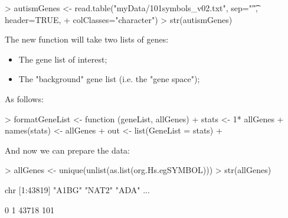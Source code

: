 \documentclass[11pt]{article}
\newcommand{\Rcode}[1]{{\texttt{\color{BrickRed}{#1}}}}
\renewenvironment{Schunk}{\vspace{\topsep}}{\vspace{\topsep}}
\begin{document}
\begin{Schunk}
\begin{Sinput}
> autismGenes <- read.table("myData/101symbols_v02.txt", sep="\t", header=TRUE,
+                           colClasses="character")
> str(autismGenes)
\end{Sinput}
\end{Schunk}

The new function \Rcode{formatGeneList} will take
two lists of genes:
\begin{itemize}
\item The gene list of interest;
\item The "background" gene list (i.e. the "gene space");
\end{itemize}

As follows:

\begin{Schunk}
\begin{Sinput}
> formatGeneList <- function (geneList, allGenes) {
+   stats <- 1* allGenes %
+   names(stats) <- allGenes
+   out <- list(GeneList = stats)
+ 	}
\end{Sinput}
\end{Schunk}

And now we can prepare the data:

\begin{Schunk}
\begin{Sinput}
> allGenes <- unique(unlist(as.list(org.Hs.egSYMBOL)))
> str(allGenes)
\end{Sinput}
\begin{Soutput}
 chr [1:43819] "A1BG" "NAT2" "ADA" ...
\end{Soutput}
\begin{Soutput}
    0     1 
43718   101 
\end{Soutput}
\end{Schunk}
\end{document}
